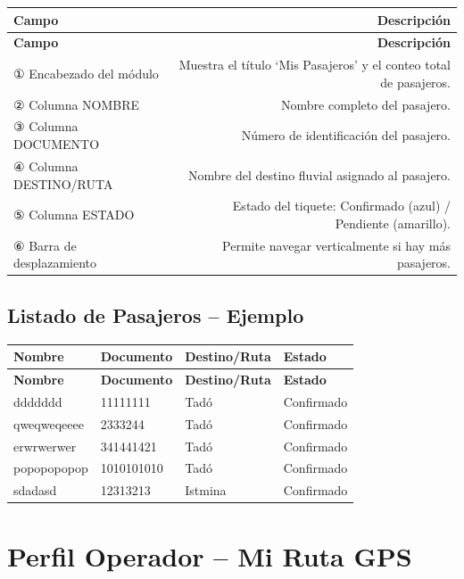 \documentclass[12pt,a4paper]{article}
\begin{document}
\begin{longtable}{LR}
  \toprule
  \textbf{Campo} & \textbf{Descripción} \\
  \midrule
  \endfirsthead
  \toprule
  \textbf{Campo} & \textbf{Descripción} \\
  \midrule
  \endhead
  \bottomrule
  \endfoot
  ① Encabezado del módulo & Muestra el título `Mis Pasajeros' y el conteo total de pasajeros. \\[4pt]
  ② Columna NOMBRE        & Nombre completo del pasajero. \\[4pt]
  ③ Columna DOCUMENTO     & Número de identificación del pasajero. \\[4pt]
  ④ Columna DESTINO/RUTA  & Nombre del destino fluvial asignado al pasajero. \\[4pt]
  ⑤ Columna ESTADO        & Estado del tiquete: Confirmado (azul) / Pendiente (amarillo). \\[4pt]
  ⑥ Barra de desplazamiento & Permite navegar verticalmente si hay más pasajeros. \\
\end{longtable}

\subsection{Listado de Pasajeros -- Ejemplo}

\begin{longtable}{llll}
  \toprule
  \textbf{Nombre} & \textbf{Documento} & \textbf{Destino/Ruta} & \textbf{Estado} \\
  \midrule
  \endfirsthead
  \toprule
  \textbf{Nombre} & \textbf{Documento} & \textbf{Destino/Ruta} & \textbf{Estado} \\
  \midrule
  \endhead
  \bottomrule
  \endfoot
  ddddddd         & 11111111   & Tadó    & Confirmado \\
  qweqweqeeee     & 2333244    & Tadó    & Confirmado \\
  erwrwerwer      & 341441421  & Tadó    & Confirmado \\
  popopopopop     & 1010101010 & Tadó    & Confirmado \\
  sdadasd         & 12313213   & Istmina & Confirmado \\
\end{longtable}

\section{Perfil Operador -- Mi Ruta GPS}
\end{document}

